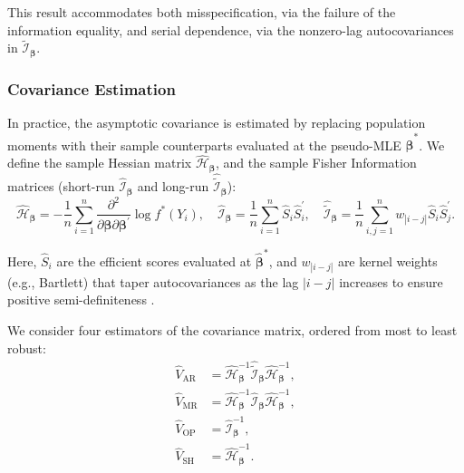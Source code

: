 \documentclass[00-main.tex]{subfiles}
\begin{document}
This result accommodates both misspecification, via the failure of the information equality, and serial dependence, via the nonzero-lag autocovariances in $\tilde{\mathscr{I}}_{\bm\beta}$.

\subsubsection{Covariance Estimation}\label{sec:covariance-estimation}
In practice, the asymptotic covariance is estimated by replacing population moments with their sample counterparts evaluated at the pseudo-MLE $\hat{\bm\beta}^*$. We define the sample Hessian matrix $\widehat{\mathcal{H}}_{\bm\beta}$, and the sample Fisher Information matrices (short-run $\widehat{\mathscr{I}}_{\bm\beta}$ and long-run $\widehat{\tilde{\mathscr{I}}}_{\bm\beta}$):
\begin{equation}\label{eq:sample_info}
    \widehat{\mathcal{H}}_{\bm\beta} = -\frac{1}{n} \sum_{i=1}^n \frac{\partial^2}{\partial\bm\beta\partial\bm\beta^\prime} \log f^*(Y_i), \quad
    \widehat{\mathscr{I}}_{\bm\beta} = \frac{1}{n} \sum_{i=1}^n \hat{S}_i \hat{S}_i^\prime, \quad
    \widehat{\tilde{\mathscr{I}}}_{\bm\beta} = \frac{1}{n} \sum_{i,j=1}^n w_{|i-j|} \hat{S}_i \hat{S}_j^\prime.
\end{equation}

Here, $\hat{S}_i$ are the efficient scores evaluated at $\hat{\bm\beta}^*$, and $w_{|i-j|}$ are kernel weights (e.g., Bartlett) that taper autocovariances as the lag $|i-j|$ increases to ensure positive semi-definiteness \citep{newey_simple_1987}.

We consider four estimators of the covariance matrix, ordered from most to least robust:
\begin{subequations}
\begin{align}
    \widehat V_\text{AR} &= \widehat{\mathcal{H}}_{\bm\beta}^{-1} \widehat{\tilde{\mathscr{I}}}_{\bm\beta} \widehat{\mathcal{H}}_{\bm\beta}^{-1}, \label{eq:V_ar} \\
    \widehat V_\text{MR} &= \widehat{\mathcal{H}}_{\bm\beta}^{-1}\widehat{\mathscr{I}}_{\bm\beta}\widehat{\mathcal{H}}_{\bm\beta}^{-1}, \label{eq:V_mr} \\
    \widehat V_\text{OP} &= \widehat{\mathscr{I}}_{\bm\beta}^{-1}, \label{eq:V_op} \\
    \widehat V_\text{SH} &= \widehat{\mathcal{H}}_{\bm\beta}^{-1}. \label{eq:V_sh}
\end{align}
\end{subequations}
\end{document}
